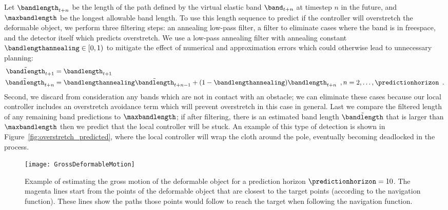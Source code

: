Let $\bandlength_{t+n}$ be the length of the path defined by the virtual elastic band $\band_{t+n}$ at timestep $n$ in the future, and $\maxbandlength$ be the longest allowable band length. To use this length sequence to predict if the controller will overstretch the deformable object, we perform three filtering steps: an annealing low-pass filter, a filter to eliminate cases where the band is in freespace, and the detector itself which predicts overstretch. We use a low-pass annealing filter with annealing constant $\bandlengthannealing \in [0, 1)$ to mitigate the effect of numerical and approximation errors which could otherwise lead to unnecessary planning:
\begin{equation}
    \begin{split}
        \tilde \bandlength_{t + 1} &= \bandlength_{t + 1} \\
        \tilde \bandlength_{t + n} &= \bandlengthannealing \tilde \bandlength_{t + n - 1} + (1 - \bandlengthannealing) \bandlength_{t + n} \enspace ,  n = 2, \dots, \predictionhorizon \enspace .
    \end{split}
\end{equation}
Second, we discard from consideration any bands which are not in contact with an obstacle; we can eliminate these cases because our local controller includes an overstretch avoidance term which will prevent overstretch in this case in general. Last we compare the filtered length of any remaining band predictions to $\maxbandlength$; if after filtering, there is an estimated band length $\tilde \bandlength$ that is larger than $\maxbandlength$ then we predict that the local controller will be stuck. An example of this type of detection is shown in Figure~\ref{fig:overstretch_predicted}, where the local controller will wrap the cloth around the pole, eventually becoming deadlocked in the process.




\begin{figure}[ht]
    \centering
    \texttt{[image: GrossDeformableMotion]}
    \caption{Example of estimating the gross motion of the deformable object for a prediction horizon $\predictionhorizon = 10$. The magenta lines start from the points of the deformable object that are closest to the target points (according to the navigation function). These lines show the paths those points would follow to reach the target when following the navigation function.}
    \label{fig:gross_deformable_motion}
\end{figure}

